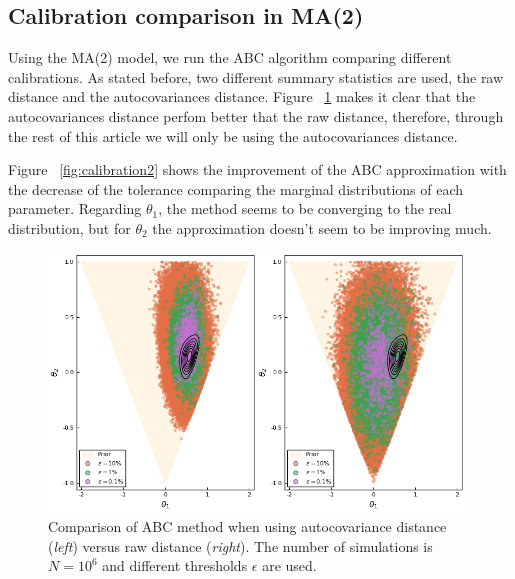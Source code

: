 \documentclass[runningheads]{llncs}
\begin{document}
\subsection{Calibration comparison in MA(2)}
\label{subsec:statistical-summaries}

Using the MA(2) model, we run the ABC algorithm comparing
different calibrations. As stated before, two different
summary statistics are used, the raw distance and the
autocovariances distance. Figure ~\ref{fig:calibration1}
makes it clear that
the autocovariances distance perfom better that the raw distance,
therefore, through the rest of this article we will only be using
the autocovariances distance.

Figure ~\ref{fig:calibration2} shows the improvement of the ABC
approximation with the decrease of the tolerance comparing the
marginal distributions of each parameter. Regarding $\theta_1$,
the method seems to be converging to the real distribution,
but for $\theta_2$ the approximation doesn't seem to be improving
much.


    \begin{figure}[H]
        \centering
        \includegraphics[width=11cm]{images/ABCmodel1_Comparison.png}
        \caption{Comparison of ABC method when using autocovariance
        distance 
        (\textit{left}) versus raw distance (\textit{right}).
        The number of simulations is $N = 10^6$ and different
        thresholds $\epsilon$ are used.}
        \label{fig:calibration1}
    \end{figure}
\end{document}
